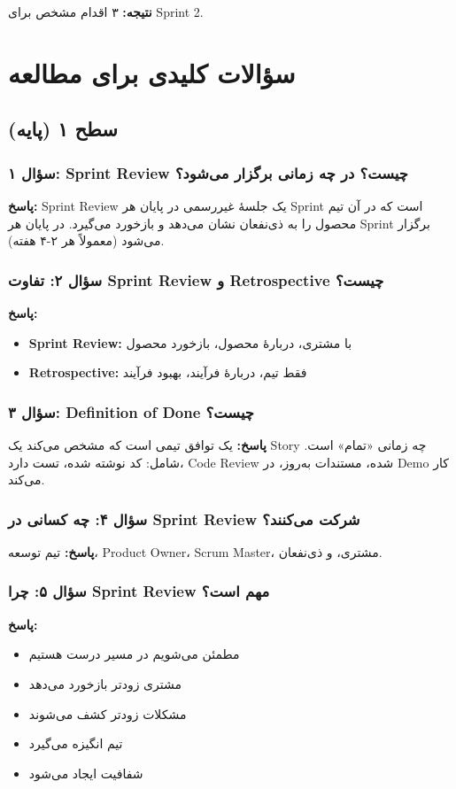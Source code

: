 \documentclass[12pt, a4paper]{article}
\begin{document}
\textbf{نتیجه:} ۳ اقدام مشخص برای Sprint 2.

\section{سؤالات کلیدی برای مطالعه}

\subsection{سطح ۱ (پایه)}

\subsubsection{سؤال ۱: Sprint Review چیست؟ در چه زمانی برگزار می‌شود؟}
\textbf{پاسخ:} Sprint Review یک جلسهٔ غیررسمی در پایان هر Sprint است که در 
آن تیم محصول را به ذی‌نفعان نشان می‌دهد و بازخورد می‌گیرد. در پایان هر Sprint 
برگزار می‌شود (معمولاً هر ۲-۴ هفته).

\subsubsection{سؤال ۲: تفاوت Sprint Review و Retrospective چیست؟}
\textbf{پاسخ:}
\begin{itemize}
    \item \textbf{Sprint Review:} با مشتری، دربارهٔ محصول، بازخورد محصول
    \item \textbf{Retrospective:} فقط تیم، دربارهٔ فرآیند، بهبود فرآیند
\end{itemize}

\subsubsection{سؤال ۳: Definition of Done چیست؟}
\textbf{پاسخ:} یک توافق تیمی است که مشخص می‌کند یک Story چه زمانی «تمام» 
است. شامل: کد نوشته شده، تست دارد، Code Review شده، مستندات به‌روز، در Demo 
کار می‌کند.

\subsubsection{سؤال ۴: چه کسانی در Sprint Review شرکت می‌کنند؟}
\textbf{پاسخ:} تیم توسعه، Product Owner، Scrum Master، مشتری، و ذی‌نفعان.

\subsubsection{سؤال ۵: چرا Sprint Review مهم است؟}
\textbf{پاسخ:}
\begin{itemize}
    \item مطمئن می‌شویم در مسیر درست هستیم
    \item مشتری زودتر بازخورد می‌دهد
    \item مشکلات زودتر کشف می‌شوند
    \item تیم انگیزه می‌گیرد
    \item شفافیت ایجاد می‌شود
\end{itemize}
\end{document}
